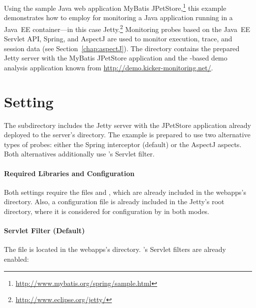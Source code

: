 Using the sample Java web application %
MyBatis JPetStore,\footnote{\url{http://www.mybatis.org/spring/sample.html}} this example %
demonstrates how to employ \KickerMonitoringPart{} for monitoring a Java application %
running in a Java~EE container---in this case Jetty.\footnote{\url{http://www.eclipse.org/jetty/}} %
Monitoring probes based on the Java~EE Servlet API, Spring, %
and AspectJ are used to monitor execution, trace, and session data (see Section~\ref{chap:aspectJ}). %
The directory \dir{\JavaEEServletExampleDistro/} contains the prepared Jetty %
server with the MyBatis JPetStore application and the \Kicker-based demo %
analysis application known from \url{http://demo.kicker-monitoring.net/}. %

\section{Setting}

The subdirectory  includes the %
Jetty server with the JPetStore application already deployed to the server's %
 directory. The example is prepared to use two alternative %
types of \Kicker{} probes: either the \Kicker{} Spring interceptor (default) or the 
\Kicker{} AspectJ aspects. Both alternatives additionally use \Kicker{}'s Servlet 
filter. %

\paragraph{Required Libraries and \KickerMonitoringPart{} Configuration}

Both settings require the files \file{\aspectJWeaverJar{}} and \file{\mainJar}, %
which are already included in the webapps's  directory. %
Also, a \Kicker{} configuration file is already included in the Jetty's root directory, %
where it is considered for configuration by \KickerMonitoringPart{} in both modes. 

\paragraph{Servlet Filter (Default)}

The file  is located in the webapps's %
 directory. \Kicker{}'s Servlet filters are already enabled: 

\setXMLListing


